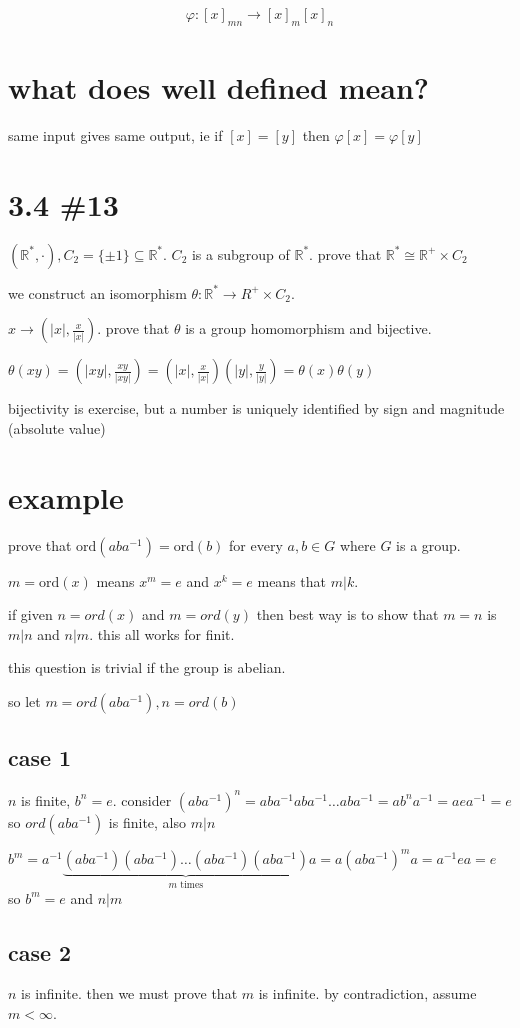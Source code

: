 \documentclass[letterpaper]{article}
\begin{document}
\begin{align*}
  \varphi:[x]_{mn}\to[x]_m[x]_n
\end{align*}
\section*{what does well defined mean?}
same input gives same output, ie if $[x]=[y]$ then $\varphi[x]=\varphi[y]$

\section*{3.4 \#13}
$(\mathbb{R}^*,\cdot), C_2=\{\pm1\}\subseteq \mathbb{R}^*$. $C_2$ is a subgroup of $\mathbb{R}^*$. prove that $\mathbb{R}^*\cong \mathbb{R}^+\times C_2$

we construct an isomorphism $\theta:\mathbb{R}^*\to R^{+}\times C_2$.

$x\to(|x|,\frac{x}{|x|})$. prove that $\theta$ is a group homomorphism and bijective.

$\theta(xy)=(|xy|,\frac{xy}{|xy|})=(|x|,\frac{x}{|x|})(|y|,\frac{y}{|y|})=\theta(x)\theta(y)$

bijectivity is exercise, but a number is uniquely identified by sign and magnitude (absolute value)

\section*{example}
prove that $\text{ord}(aba^{-1})=\text{ord}(b)$ for every $a,b\in G$ where $G$ is a group.

$m=\text{ord}(x)$ means $x^m=e$ and $x^k=e$ means that $m|k$.

if given $n=ord(x)$ and $m=ord(y)$ then best way is to show that $m=n$ is $m|n$ and $n|m$. this all works for finit.

this question is trivial if the group is abelian.

so let $m=ord(aba^{-1}), n=ord(b)$

\subsection*{case 1}
$n$ is finite, $b^n=e$. consider $(aba^{-1})^n=aba^{-1}aba^{-1}\dots aba^{-1}=ab^{n}a^{-1}=aea^{-1}=e$ so $ord(aba^{-1})$ is finite, also $m|n$

$b^m=a^{-1}\underbrace{(aba^{-1})(aba^{-1})\dots(aba^{-1})(aba^{-1})}_{m\text{ times}}a=a(aba^{-1})^ma=a^{-1}ea=e$ so $b^m=e$ and $n|m$
\subsection*{case 2}
$n$ is infinite. then we must prove that $m$ is infinite. by contradiction, assume $m<\infty$.
\end{document}
